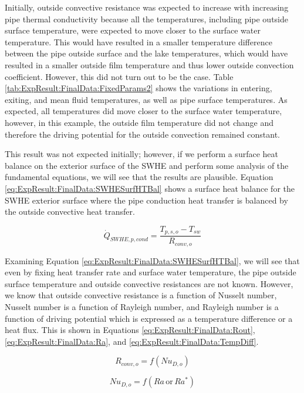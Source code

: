 Initially, outside convective resistance was expected to increase with increasing pipe thermal conductivity because all the temperatures, including pipe outside surface temperature, were expected to move closer to the surface water temperature. This would have resulted in a smaller temperature difference between the pipe outside surface and the lake temperatures, which would have resulted in a smaller outside film temperature and thus lower outside convection coefficient. However, this did not turn out to be the case. Table \ref{tab:ExpResult:FinalData:FixedParams2} shows the variations in entering, exiting, and mean fluid temperatures, as well as pipe surface temperatures. As expected, all temperatures did move closer to the surface water temperature, however, in this example, the outside film temperature did not change and therefore the driving potential for the outside convection remained constant. 

This result was not expected initially; however, if we perform a surface heat balance on the exterior surface of the SWHE and perform some analysis of the fundamental equations, we will see that the results are plausible. Equation \ref{eq:ExpResult:FinalData:SWHESurfHTBal} shows a surface heat balance for the SWHE exterior surface where the pipe conduction heat transfer is balanced by the outside convective heat transfer.

\begin{equation}
	\dot{Q}_{SWHE,p,cond} = \frac{T_{p,s,o} - T_{sw}}{R_{conv,o}}
	\label{eq:ExpResult:FinalData:SWHESurfHTBal}
\end{equation}

Examining Equation \ref{eq:ExpResult:FinalData:SWHESurfHTBal}, we will see that even by fixing heat transfer rate and surface water temperature, the pipe outside surface temperature and outside convective resistances are not known. However, we know that outside convective resistance is a function of Nusselt number, Nusselt number is a function of Rayleigh number, and Rayleigh number is a function of driving potential which is expressed as a temperature difference or a heat flux. This is shown in Equations \ref{eq:ExpResult:FinalData:Rout}, \ref{eq:ExpResult:FinalData:Ra}, and \ref{eq:ExpResult:FinalData:TempDiff}.

\begin{equation}
	R_{conv,o} = f(Nu_{D,o})
	\label{eq:ExpResult:FinalData:Rout}
\end{equation}

\begin{equation}
	Nu_{D,o} = f(Ra \, \mbox{or} \, Ra^*)
	\label{eq:ExpResult:FinalData:Ra}
\end{equation}

